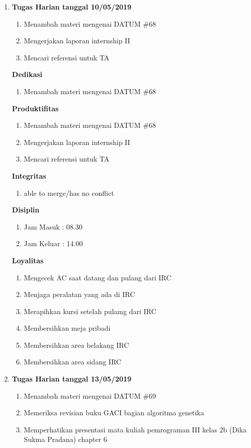 \begin{enumerate}
\item \textbf{Tugas Harian tanggal 10/05/2019}
\begin{enumerate}
\item Menambah materi mengenai DATUM \#68
\item Mengerjakan laporan internship II
\item Mencari referensi untuk TA
\end{enumerate}

\textbf{Dedikasi}
\begin{enumerate}
\item Menambah materi mengenai DATUM \#68
\end{enumerate}

\textbf{Produktifitas}
\begin{enumerate}
\item Menambah materi mengenai DATUM \#68
\item Mengerjakan laporan internship II
\item Mencari referensi untuk TA
\end{enumerate}

\textbf{Integritas}
\begin{enumerate}
\item able to merge/has no conflict
\end{enumerate}

\textbf{Disiplin}
\begin{enumerate}
\item Jam Masuk : 08.30
\item Jam Keluar : 14.00
\end{enumerate}

\textbf{Loyalitas}
\begin{enumerate}
\item Mengecek AC saat datang dan pulang dari IRC
\item Menjaga peralatan yang ada di IRC
\item Merapihkan kursi setelah pulamg dari IRC
\item Membersihkan meja pribadi
\item Membersihkan area belakang IRC
\item Membersihkan area sidang IRC
\end{enumerate}


\item \textbf{Tugas Harian tanggal 13/05/2019}
\begin{enumerate}
\item Menambah materi mengenai DATUM \#69
\item Memeriksa revisian buku GACI bagian algoritma genetika
\item Memperhatikan presentasi mata kuliah pemrograman III kelas 2b (Dika Sukma Pradana) chapter 6
\end{enumerate}


\end{enumerate}
